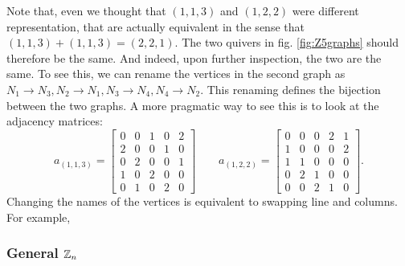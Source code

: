            Note that, even we thought that $(1,1,3)$ and $(1,2,2)$ were different representation, that are actually equivalent in the sense that $(1,1,3)+(1,1,3)=(2,2,1)$. The two quivers in fig. \ref{fig:Z5graphs} should therefore be the same. And indeed, upon further inspection, the two are the same. To see this, we can rename the vertices in the second graph as $N_1\to N_3,N_2\to N_1,N_3\to N_4,N_4\to N_2$. This renaming defines the bijection between the two graphs. A more pragmatic way to see this is to look at the adjacency matrices:
           \begin{equation}
                a_{(1,1,3)}=
                \begin{bmatrix}
                    0 & 0 & 1 & 0 & 2 \\
                    2 & 0 & 0 & 1 & 0 \\
                    0 & 2 & 0 & 0 & 1 \\
                    1 & 0 & 2 & 0 & 0 \\
                    0 & 1 & 0 & 2 & 0
                \end{bmatrix}\qquad
                a_{(1,2,2)}=
                \begin{bmatrix}
                    0 & 0 & 0 & 2 & 1 \\
                    1 & 0 & 0 & 0 & 2 \\
                    1 & 1 & 0 & 0 & 0 \\
                    0 & 2 & 1 & 0 & 0 \\
                    0 & 0 & 2 & 1 & 0
                \end{bmatrix}.
           \end{equation}
           Changing the names of the vertices is equivalent to swapping line and columns. For example, 

        \subsubsection{General $\mathbb{Z}_n$}


